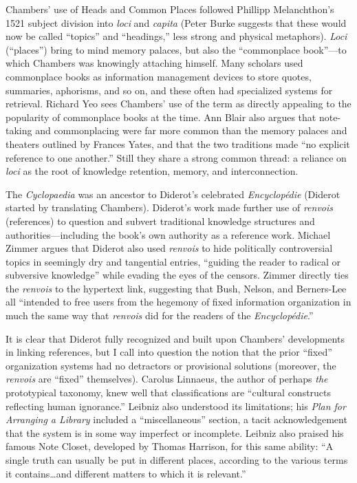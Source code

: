 Chambers' use of Heads and Common Places followed Phillipp Melanchthon's 1521 subject division into \emph{loci} and \emph{capita} (Peter Burke suggests that these would now be called ``topics'' and ``headings,'' less strong and physical metaphors).\autocite[95]{burke_social_2000} \emph{Loci} (``places'') bring to mind memory palaces, but also the ``commonplace book''---to which Chambers was knowingly attaching himself. Many scholars used commonplace books as information management devices to store quotes, summaries, aphorisms, and so on, and these often had specialized systems for retrieval. Richard Yeo sees Chambers' use of the term as directly appealing to the popularity of commonplace books at the time.\autocite[65-66]{yeo_solution_2003} Ann Blair also argues that note-taking and commonplacing were far more common than the memory palaces and theaters outlined by Frances Yates, and that the two traditions made ``no explicit reference to one another.''\autocite[``Note Taking as an Aid to Memory'']{blair_too_2010} Still they share a strong common thread: a reliance on \emph{loci} as the root of knowledge retention, memory, and interconnection.

The \emph{Cyclopaedia} was an ancestor to Diderot's celebrated \emph{Encyclop\'{e}die} (Diderot started by translating Chambers). Diderot's work made further use of \emph{renvois} (references) to question and subvert traditional knowledge structures and authorities---including the book's own authority as a reference work. Michael Zimmer argues that Diderot also used \emph{renvois} to hide politically controversial topics in seemingly dry and tangential entries, ``guiding the reader to radical or subversive knowledge'' while evading the eyes of the censors.\autocite[103]{zimmer_renvois_2009} Zimmer directly ties the \emph{renvois} to the hypertext link, suggesting that Bush, Nelson, and Berners-Lee all ``intended to free users from the hegemony of fixed information organization in much the same way that \emph{renvois} did for the readers of the \emph{Encyclop\'{e}die}.''\autocite[104]{zimmer_renvois_2009}

It is clear that Diderot fully recognized and built upon Chambers' developments in linking references, but I call into question the notion that the prior ``fixed'' organization systems had no detractors or provisional solutions (moreover, the \emph{renvois} are ``fixed'' themselves). Carolus Linnaeus, the author of perhaps \emph{the} prototypical taxonomy, knew well that classifications are ``cultural constructs reflecting human ignorance.''\autocite[99]{zimmer_renvois_2009} Leibniz also understood its limitations; his \emph{Plan for Arranging a Library} included a ``miscellaneous'' section, a tacit acknowledgement that the system is in some way imperfect or incomplete.\autocite[106]{burke_social_2000} Leibniz also praised his famous Note Closet, developed by Thomas Harrison, for this same ability: ``A single truth can usually be put in different places, according to the various terms it contains\ldots and different matters to which it is relevant.''\autocite[``Managing Abundant Notes'']{blair_too_2010} 

